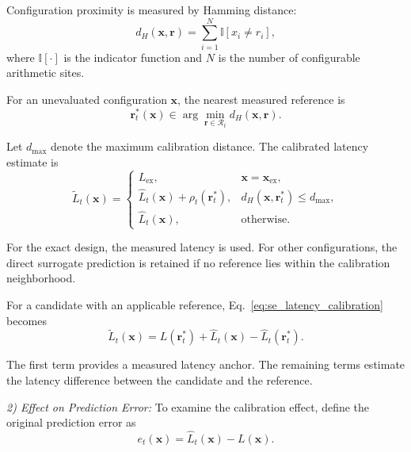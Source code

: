 Configuration proximity is measured by Hamming distance:
\begin{equation}
    d_H(\mathbf{x},\mathbf{r})
    =
    \sum_{i=1}^{N}
    \mathbb{I}[x_i\neq r_i],
    \label{eq:se_hamming_distance}
\end{equation}
where $\mathbb{I}[\cdot]$ is the indicator function and $N$ is the number of configurable arithmetic sites.

For an unevaluated configuration $\mathbf{x}$, the nearest measured reference is
\begin{equation}
    \mathbf{r}_t^*(\mathbf{x})
    \in
    \arg\min_{\mathbf{r}\in\mathcal{R}_t}
    d_H(\mathbf{x},\mathbf{r}).
    \label{eq:se_nearest_anchor}
\end{equation}

Let $d_{\max}$ denote the maximum calibration distance. The calibrated latency estimate is
\begin{equation}
    \widetilde L_t(\mathbf{x})
    =
    \begin{cases}
    L_{\mathrm{ex}},
    &\mathbf{x}=\mathbf{x}_{\mathrm{ex}},\\[2pt]
    \widehat L_t(\mathbf{x})
    +\rho_t(\mathbf{r}_t^*),
    &d_H(\mathbf{x},\mathbf{r}_t^*)\le d_{\max},\\[2pt]
    \widehat L_t(\mathbf{x}),
    &\text{otherwise}.
    \end{cases}
    \label{eq:se_latency_calibration}
\end{equation}

For the exact design, the measured latency is used. For other configurations, the direct surrogate prediction is retained if no reference lies within the calibration neighborhood.

For a candidate with an applicable reference, Eq.~\ref{eq:se_latency_calibration} becomes
\begin{equation}
    \widetilde L_t(\mathbf{x})
    =
    L(\mathbf{r}_t^*)
    +
    \widehat L_t(\mathbf{x})
    -
    \widehat L_t(\mathbf{r}_t^*).
    \label{eq:se_difference_calibration}
\end{equation}

The first term provides a measured latency anchor. The remaining terms estimate the latency difference between the candidate and the reference.

\noindent\textit{2) Effect on Prediction Error:}
To examine the calibration effect, define the original prediction error as
\begin{equation}
    e_t(\mathbf{x})
    =
    \widehat L_t(\mathbf{x})-L(\mathbf{x}).
    \label{eq:se_direct_error}
\end{equation}


